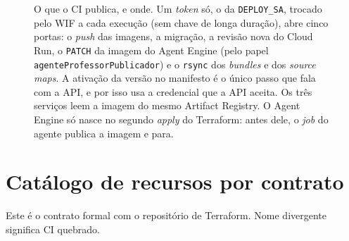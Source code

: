 \begin{figure}[H]
{}
\caption[Implantação detalhada --- o que o CI publica]{O que o CI publica, e
  onde. Um \emph{token} só, o da \texttt{DEPLOY\_SA}, trocado pelo WIF a cada
  execução (sem chave de longa duração), abre cinco portas: o \emph{push} das
  imagens, a migração, a revisão nova do Cloud Run, o \texttt{PATCH} da imagem
  do Agent Engine (pelo papel \texttt{agenteProfessorPublicador}) e o
  \texttt{rsync} dos \emph{bundles} e dos \emph{source maps}. A ativação da
  versão no manifesto é o único passo que fala com a API, e por isso usa a
  credencial que a API aceita. Os três serviços leem a imagem do mesmo Artifact
  Registry. O Agent Engine só nasce no segundo \emph{apply} do Terraform: antes
  dele, o \emph{job} do agente publica a imagem e para.}
\label{fig:deploy-publicacao}
\end{figure}

\section{Catálogo de recursos por contrato}

Este é o contrato formal com o repositório de Terraform. Nome divergente
significa CI quebrado.

